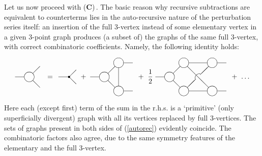 \documentclass[a4paper,12pt]{article}
\begin{document}
Let us now proceed with (\textbf{C})\,. The basic reason why recursive
subtractions are equivalent to counterterms lies in the auto-recursive
nature of the perturbation series itself: an insertion of the full 3-vertex
instead of some elementary vertex in a given 3-point graph produces
(a subset of) the graphs of the same full 3-vertex, with correct
combinatoric coefficients. Namely, the following identity holds:
\begin{equation}
\label{autorec}
\parbox{1.5cm}{
\begin{picture}(35,60)
\put(20,30){\circle{14}}
\put(0,30){\line(1,0){13}}
\put(25,35){\line(1,1){10}}
\put(25,25){\line(1,-1){10}}
\end{picture}
} =
\parbox{1.2cm}{
\begin{picture}(30,60)
\put(20,30){\circle*{3}}
\put(5,30){\line(1,0){15}}
\put(20,30){\line(1,1){10}}
\put(20,30){\line(1,-1){10}}
\end{picture}
} + \
\parbox{2.3cm}{
\begin{picture}(60,60)
\put(20,30){\circle{14}}
\put(40,10){\circle{14}}
\put(40,50){\circle{14}}
\put(0,30){\line(1,0){13}}
\put(47,50){\line(1,0){13}}
\put(47,10){\line(1,0){13}}
\put(25,35){\line(1,1){10}}
\put(25,25){\line(1,-1){10}}
\put(40,17){\line(0,1){26.5}}
\end{picture}
} + \ \frac{1}{2} \
\parbox{3.7cm}{
\begin{picture}(100,60)
\put(20,30){\circle{14}}
\put(40,10){\circle{14}}
\put(40,50){\circle{14}}
\put(80,10){\circle{14}}
\put(80,50){\circle{14}}
\put(87,50){\line(1,0){13}}
\put(87,10){\line(1,0){13}}
\put(0,30){\line(1,0){13}}
\put(47,50){\line(1,0){26}}
\put(47,10){\line(1,0){26}}
\put(25,35){\line(1,1){10}}
\put(25,25){\line(1,-1){10}}
\put(45,15){\line(1,1){12}}
\put(75,45){\line(-1,-1){12}}
\put(45,45){\line(1,-1){30}}
\put(63.5,27){\oval(15,15)[tl]}
\end{picture}
} + \ \ldots
\end{equation}
Here each (except first) term of the sum in the r.h.s. is a `primitive'
(only superficially divergent) graph with all its vertices replaced by
full 3-vertices. The sets of graphs present in both sides of (\ref{autorec})
evidently coincide. The combinatoric factors also agree, due to the same
symmetry features of the elementary and the full 3-vertex.
\end{document}
